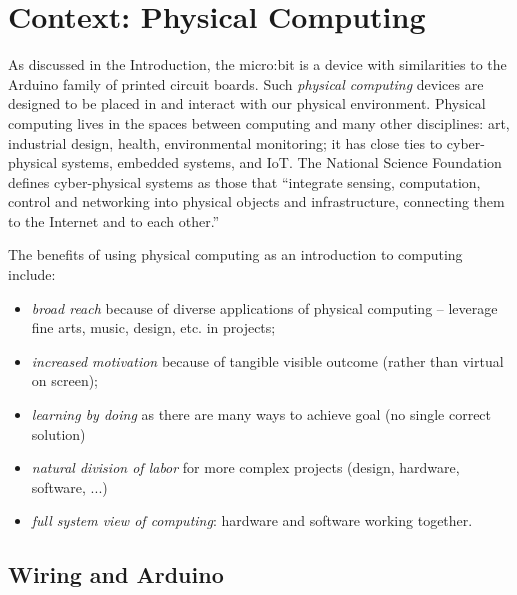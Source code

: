 \section{Context: Physical Computing}
\label{sec:physical}

As discussed in the Introduction, the micro:bit is a device
with similarities to the Arduino family of printed 
circuit boards. Such {\em physical computing} devices
are designed to be placed in and interact with our physical environment. 
Physical computing lives in the spaces between computing and many other disciplines:
art, industrial design, health, environmental monitoring; it has
close ties to cyber-physical systems, embedded systems, and IoT. The National
Science Foundation
defines cyber-physical systems as those that ``integrate sensing, computation, 
control and networking into physical objects and infrastructure, 
connecting them to the Internet and to each other.''\cite{NSF}


%

The benefits of using physical computing as an introduction to computing include:
\begin{itemize}
\item {\em broad reach} because of diverse applications of physical computing -- leverage fine arts, music, design, etc. in projects;
\item {\em increased motivation} because of tangible visible outcome (rather than virtual on screen);
\item {\em learning by doing} as there are many ways to achieve goal (no single correct solution)
\item {\em natural division of labor} for more complex projects (design, hardware, software, ...)
\item {\em full system view of computing}: hardware and software working together.
\end{itemize}

\subsection{Wiring and Arduino}




